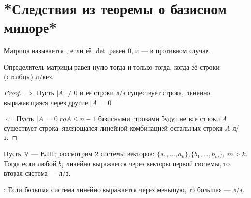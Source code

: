 \section{*Следствия из теоремы о базисном миноре*}
\begin{opred}
Матрица называется , если её $\det$ равен 0, и  --- в противном случае.
\end{opred}
\begin{theor}

Определитель матрицы равен нулю тогда и только тогда, когда её строки (столбцы) л/нез.
\end{theor}
\begin{proof}$\Longrightarrow$ Пусть $|A|\neq0$ и её строки л/з \then существует строка, линейно выражающаяся через другие \then $|A|=0$

$\Longleftarrow$ Пусть $|A|=0$ \then $rg A\leq n-1$ \then базисными строками будут не все строки $A$ \then существует строка, являющаяся линейной комбинацией остальных \then строки $A$ л/з.
\end{proof}
\begin{theor}

Пусть $\mathbb{V}$ --- ВЛП; рассмотрим 2 системы векторов: $\{a_1,\ldots,a_k\},\{b_1,\ldots,b_m\},\ m>k$. Тогда если любой $b_j$ линейно выражается через векторы первой системы, то вторая система --- л/з.

: Если большая система линейно выражается через меньшую, то большая --- л/з.
\end{theor}
